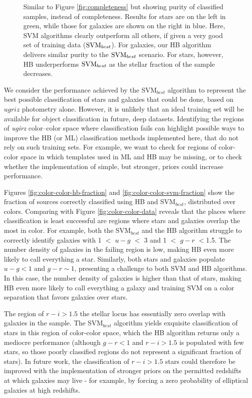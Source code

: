 \documentclass[12pt,preprint]{aastex}
\begin{document}
\begin{figure}
\centering
\caption{Similar to Figure \ref{fig:completeness} but showing purity
  of classified samples, instead of completeness. Results for stars are on the left in green, while those for galaxies are shown on the right in blue.  Here, SVM algorithms 
  clearly outperform all others, if given a very good set of training
  data (${\rm SVM}_{best}$).  For galaxies, our HB algorithm delivers
  similar purity to the ${\rm SVM}_{best}$ scenario.  For stars,
  however, HB underperforms ${\rm SVM}_{best}$ as the stellar fraction
  of the sample decreases.}
\label{fig:purity}
\end{figure}

We consider the performance achieved by the SVM$_{best}$ algorithm to represent the best possible classification of stars and galaxies that could be done, based on $ugriz$ photometry alone.   However, it is unlikely that an ideal training set will be available for object classification in future, deep datasets.  Identifying the regions of {\it ugirz} color--color
space where classification fails can highlight possible ways to improve the HB (or ML) classification methods implemented here, that do not rely on such training sets.  For example, we want to check for regions of color-color space in which templates used in ML and HB may be missing, or to check whether the implementation of simple, but stronger, priors could increase performance.   

Figures
\ref{fig:color-color-hb-fraction} and \ref{fig:color-color-svm-fraction} show the fraction of sources
correctly classified using HB and SVM$_{best}$, distributed over
colors.  Comparing with Figure \ref{fig:color-color-data} reveals that the places where classification is least successful
are regions where stars and galaxies overlap the most in color.  For example, both the SVM$_{best}$ and the HB algorithm struggle to correctly identify galaxies with 1 $<$ $u-g$ $<$ 3 and 1 $<$ $g-r$ $<$1.5.  The number density of galaxies in the failing region is low, making HB even more likely to call everything a star.  Similarly, both stars and galaxies populate $u-g < 1$ and $g-r \sim 1$, presenting a challenge to both SVM and HB algorithms.  In this case, the number density of galaxies is higher than that of stars, making HB even more likely to call everything a galaxy and training SVM on a color separation that favors galaxies over stars.  

The region of $r-i>1.5$ the stellar locus has essentially zero overlap with galaxies in the sample.  The SVM$_{best}$ algorithm yields exquisite classification of stars in this region of color-color space, which the HB algorithm returns only a mediocre performance (although $g-r < 1$ and $r-i > 1.5$ is populated with few stars, so those poorly classified regions do not represent a significant fraction of stars).  In future work, the classification of $r-i > 1.5$ stars could therefore be improved with the implementation of stronger priors on the permitted redshifts at which galaxies may live - for example, by forcing a zero probability of elliptical galaxies at high redshifts.
\end{document}
